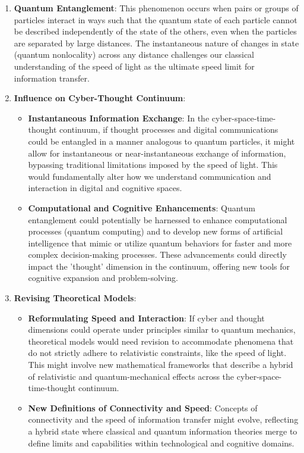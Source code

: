 \documentclass{article}
\begin{document}
\begin{enumerate}
    \item \textbf{Quantum Entanglement}: This phenomenon occurs when pairs or groups of particles interact in ways such that the quantum state of each particle cannot be described independently of the state of the others, even when the particles are separated by large distances. The instantaneous nature of changes in state (quantum nonlocality) across any distance challenges our classical understanding of the speed of light as the ultimate speed limit for information transfer.
    \item \textbf{Influence on Cyber-Thought Continuum}:
    \begin{itemize}
        \item \textbf{Instantaneous Information Exchange}: In the cyber-space-time-thought continuum, if thought processes and digital communications could be entangled in a manner analogous to quantum particles, it might allow for instantaneous or near-instantaneous exchange of information, bypassing traditional limitations imposed by the speed of light. This would fundamentally alter how we understand communication and interaction in digital and cognitive spaces.
        \item \textbf{Computational and Cognitive Enhancements}: Quantum entanglement could potentially be harnessed to enhance computational processes (quantum computing) and to develop new forms of artificial intelligence that mimic or utilize quantum behaviors for faster and more complex decision-making processes. These advancements could directly impact the 'thought' dimension in the continuum, offering new tools for cognitive expansion and problem-solving.
    \end{itemize}
    \item \textbf{Revising Theoretical Models}:
    \begin{itemize}
        \item \textbf{Reformulating Speed and Interaction}: If cyber and thought dimensions could operate under principles similar to quantum mechanics, theoretical models would need revision to accommodate phenomena that do not strictly adhere to relativistic constraints, like the speed of light. This might involve new mathematical frameworks that describe a hybrid of relativistic and quantum-mechanical effects across the cyber-space-time-thought continuum.
        \item \textbf{New Definitions of Connectivity and Speed}: Concepts of connectivity and the speed of information transfer might evolve, reflecting a hybrid state where classical and quantum information theories merge to define limits and capabilities within technological and cognitive domains.
    \end{itemize}
\end{enumerate}
\end{document}
